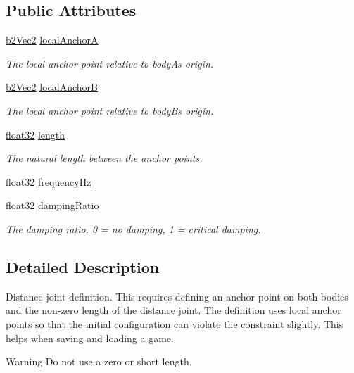 \subsection*{Public Attributes}
\begin{DoxyCompactItemize}
\item 
\mbox{\hyperlink{structb2_vec2}{b2\+Vec2}} \mbox{\hyperlink{structb2_distance_joint_def_a15c7a75fa277e2056bf1b44198658518}{local\+AnchorA}}
\begin{DoxyCompactList}\small\item\em The local anchor point relative to bodyA\textquotesingle{}s origin. \end{DoxyCompactList}\item 
\mbox{\hyperlink{structb2_vec2}{b2\+Vec2}} \mbox{\hyperlink{structb2_distance_joint_def_a3c8995be726238eee084af750442255c}{local\+AnchorB}}
\begin{DoxyCompactList}\small\item\em The local anchor point relative to bodyB\textquotesingle{}s origin. \end{DoxyCompactList}\item 
\mbox{\hyperlink{b2_settings_8h_aacdc525d6f7bddb3ae95d5c311bd06a1}{float32}} \mbox{\hyperlink{structb2_distance_joint_def_ac2c48ad52de91c804c386c12c5bf3714}{length}}
\begin{DoxyCompactList}\small\item\em The natural length between the anchor points. \end{DoxyCompactList}\item 
\mbox{\hyperlink{b2_settings_8h_aacdc525d6f7bddb3ae95d5c311bd06a1}{float32}} \mbox{\hyperlink{structb2_distance_joint_def_a35e2362bcb6c58734f95d0ac045863ea}{frequency\+Hz}}
\item 
\mbox{\hyperlink{b2_settings_8h_aacdc525d6f7bddb3ae95d5c311bd06a1}{float32}} \mbox{\hyperlink{structb2_distance_joint_def_ad009b24ff211158eb4e1db4815a63b94}{damping\+Ratio}}
\begin{DoxyCompactList}\small\item\em The damping ratio. 0 = no damping, 1 = critical damping. \end{DoxyCompactList}\end{DoxyCompactItemize}


\subsection{Detailed Description}
Distance joint definition. This requires defining an anchor point on both bodies and the non-\/zero length of the distance joint. The definition uses local anchor points so that the initial configuration can violate the constraint slightly. This helps when saving and loading a game. \begin{DoxyWarning}{Warning}
Do not use a zero or short length. 
\end{DoxyWarning}


